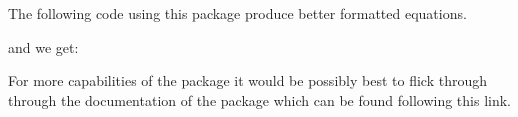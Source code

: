 The following code using this package produce better formatted equations.

and we get:


For more capabilities of the package it would be possibly best to flick through
through the documentation of the package which can be found following this link.



